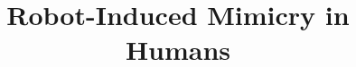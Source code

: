\documentclass{acm_proc_article-sp}
\begin{document}
\title{Robot-Induced Mimicry in Humans}
%
%
%
%
%
\end{document}
